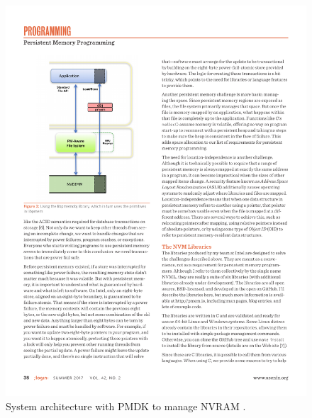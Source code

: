 \begin{figure}[h!]
    \centering
    \includegraphics[scale=1]{figures/pmdk-sys-arch-extract.pdf}
    \caption{System architecture with PMDK to manage NVRAM \cite{rudoff2017persistent}.}
    \label{fig:pmdk-sys}
\end{figure}

